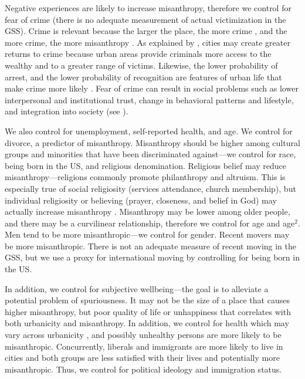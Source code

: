\documentclass[11pt, letterpaper]{article}
\begin{document}
\begin{spacing}{1.4}
Negative experiences are likely to increase misanthropy, therefore we control
for fear of crime (there is no adequate measurement of actual victimization in
the GSS). Crime is relevant because the larger the place, the more crime
\citep{bettencourt10b,wirth38,white77}, and the more crime, the more misanthropy
\citep{wilson85}. As explained by \citet{glaeser1999}, cities may create greater
returns to crime because urban areas provide criminals more access to the wealthy and to
a greater range of victims. Likewise, the lower probability of
arrest, and the lower probability of recognition are features of urban life that
make crime more likely  \citep{glaeser1999}. %
 Fear of crime can result in social problems such as lower interpersonal and institutional trust, change in behavioral patterns and lifestyle, and integration into society (see \citet{krulichova2018life}). 

We also control for unemployment, self-reported health, and age. We control for
divorce, a predictor of misanthropy.  Misanthropy should be higher among
cultural groups and minorities that have been discriminated against---we control
for race, being born in the US, and religious denomination. Religious belief may
reduce misanthropy---religions commonly promote philanthropy and altruism. This
is especially true of social religiosity (services attendance, church
membership), but individual religiosity or believing (prayer, closeness, and
belief in God) may actually increase misanthropy \citep{aok20rel}. Misanthropy
may be lower among older people, and there may be a curvilinear relationship,
therefore we control for age and age$^2$. Men tend to be more misanthropic---we
control for gender. Recent movers may be more misanthropic. There is not an
adequate measure of recent moving in the GSS, but we use a proxy for international moving by controlling for being born in the US.

In addition, we control for subjective wellbeing---the goal is to alleviate a potential problem of spuriousness. It may not be the size of a place that causes higher misanthropy, but %
poor quality of life or unhappiness \citep{aok21} that correlates with
both urbanicity and misanthropy.  %
 In addition, we control for health which may vary across urbanicity
 \citep[e.g.,][]{chen2019differences}, and possibly unhealthy persons are more likely to be misanthropic.  
 Concurrently, liberals and immigrants are more likely to live in cities and both groups are less satisfied with their lives \citep{aok11a,aokJap14} and potentially more misanthropic. Thus, we control for political ideology and immigration status.


\end{spacing}
\end{document}
